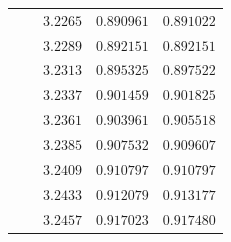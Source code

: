 \documentclass[10pt]{amsart}
\numberwithin{equation}{section}
\theoremstyle{definition}
\begin{document}
\begin{longtable}{|c|c|c|c|c|}
  &  &  $3.2265 $  &  $ 0.890961 $ & $ 0.891022 $ \\
  &  &  $3.2289 $  &  $ 0.892151 $ & $ 0.892151 $ \\
  &  &  $3.2313 $  &  $ 0.895325 $ & $ 0.897522 $ \\
  &  &  $3.2337 $  &  $ 0.901459 $ & $ 0.901825 $ \\
  &  &  $3.2361 $  &  $ 0.903961 $ & $ 0.905518 $ \\
  &  &  $3.2385 $  &  $ 0.907532 $ & $ 0.909607 $ \\
  &  &  $3.2409 $  &  $ 0.910797 $ & $ 0.910797 $ \\
  &  &  $3.2433 $  &  $ 0.912079 $ & $ 0.913177 $ \\
  &  &  $3.2457 $  &  $ 0.917023 $ & $ 0.917480 $ \\

\end{longtable}
\end{document}

